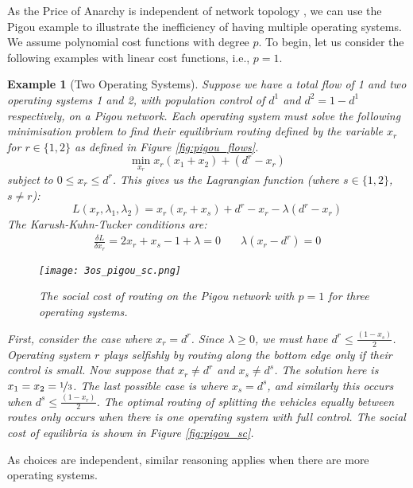 \documentclass{article}
\newtheorem{example}{Example}
\begin{document}
    As the Price of Anarchy is independent of network topology \cite{Roughgarden2003}, we can use the Pigou example to illustrate the inefficiency of having multiple operating systems. We assume polynomial cost functions with degree $p$. To begin, let us consider the following examples with linear cost functions, i.e., $p=1$.

    \begin{example}[Two Operating Systems]\label{ex:pigou2}
    Suppose we have a total flow of 1 and two operating systems 1 and 2, with population control of $d^1$ and $d^2 = 1-d^1$ respectively, on a Pigou network. 
    Each operating system must solve the following minimisation problem to find their equilibrium routing defined by the variable $x_r$ for $r \in \{ 1,2\}$ as defined in Figure \ref{fig:pigou_flows}. 
    \[  \min_{x_r} x_r(x_1+x_2) +  (d^r-x_r) \]
    subject to $0 \leq x_r \leq d^r$. This gives us the Lagrangian function (where $s \in \{1,2\}$, $s \neq r$):
    \[ L(x_r,\lambda_1,\lambda_2)=x_r(x_r+x_s) + d^r-x_r-\lambda(d^r-x_r) \]
    The Karush-Kuhn-Tucker conditions are:
    \begin{align*}
        \frac{\delta L}{\delta x_r}= 2x_r+x_s-1+\lambda=0 & \quad \lambda(x_r-d^r) = 0
    \end{align*}
      \begin{figure}[!ht]
    \centering
        \texttt{[image: 3os\_pigou\_sc.png]}
        \caption{The social cost of routing on the Pigou network with $p=1$ for three operating systems.}
        \label{fig:pigou_3}
    \end{figure}

    First, consider the case where $x_r=d^r$. Since $\lambda \geq 0$, we must have $d^r \leq \frac{(1-x_s)}{2}$. Operating system $r$ plays selfishly by routing along the bottom edge only if their control is small. Now suppose that $x_r \neq d^r$ and $x_s \neq d^s$. The solution here is $x_1=x_2=\nicefrac{1}{3}$. The last possible case is where $x_s=d^s$, and similarly this occurs when $d^s \leq \frac{(1-x_r)}{2}$. The optimal routing of splitting the vehicles equally between routes only occurs when there is one operating system with full control. The social cost of equilibria is shown in Figure \ref{fig:pigou_sc}.
 \end{example}
  As choices are independent, similar reasoning applies when there are more operating systems.
    
\end{document}
